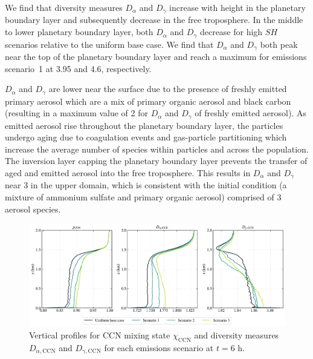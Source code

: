 We find that diversity measures $D_{\alpha}$ and $D_{\gamma}$ increase with height in the planetary boundary layer and subsequently decrease in the free troposphere. In the middle to lower planetary boundary layer, both $D_{\alpha}$ and $D_{\gamma}$ decrease for high $SH$ scenarios relative to the uniform base case. We find that $D_{\alpha}$ and $D_{\gamma}$ both peak near the top of the planetary boundary layer and reach a maximum for emissions scenario~1 at 3.95 and 4.6, respectively. 

$D_{\alpha}$ and $D_{\gamma}$ are lower near the surface due to the presence of freshly emitted primary aerosol which are a mix of primary organic aerosol and black carbon (resulting in a maximum value of 2 for $D_{\alpha}$ and $D_{\gamma}$ of freshly emitted aerosol). As emitted aerosol rise throughout the planetary boundary layer, the particles undergo aging due to coagulation events and gas-particle partitioning which increase the average number of species within particles and across the population. The inversion layer capping the planetary boundary layer prevents the transfer of aged and emitted aerosol into the free troposphere. This results in  $D_{\alpha}$ and $D_{\gamma}$ near 3 in the upper domain, which is consistent with the initial condition (a mixture of ammonium sulfate and primary organic aerosol) comprised of 3 aerosol species.  

\begin{figure}[!t]
  \centering
    \includegraphics[width=\textwidth]{figures/chapter5/aerosol-ccn-mixingstate-vertical-profiles-time36.pdf}
    \caption{Vertical profiles for CCN mixing state $\chi_{\text{CCN}}$ and diversity measures $D_{\alpha,\text{CCN}}$ and $D_{\gamma,\text{CCN}}$ for each emissions scenario at $t=6$ h.}
    \label{fig:ccn-mixing-state-vert-profiles}
\end{figure}

